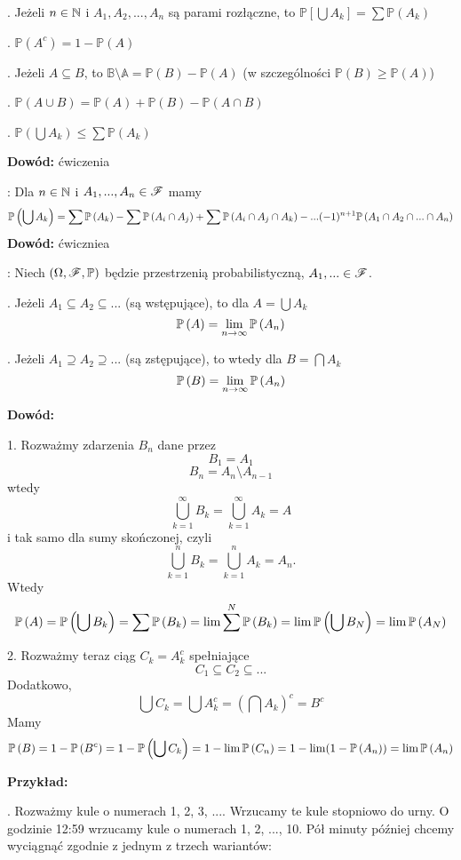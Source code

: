 \documentclass{article}
\begin{document}
. Jeżeli $n\in\mathbb{N}$ i $A_1, A_2,...,A_n$ są parami rozłączne, to $\mathbb{P}[\bigcup A_k]=\sum\mathbb{P}(A_k)$

. $\mathbb{P}(A^c)=1-\mathbb{P}(A)$

. Jeżeli $A\subseteq B$, to $\mathbb{B\setminus A}=\mathbb{P}(B)-\mathbb{P}(A)$ (w szczególności $\mathbb{P}(B)\geq\mathbb{P}(A)$)

. $\mathbb{P}(A\cup B)=\mathbb{P}(A)+\mathbb{P}(B)-\mathbb{P}(A\cap B)$

. $\mathbb{P}(\bigcup A_k)\leq\sum\mathbb{P}(A_k)$

\textbf{Dowód:} ćwiczenia \proofend
\medskip

: Dla $n\in \mathbb{N}$ i $A_1,...,A_n\in\mathcal{F}$ mamy
$$\mathbb{P}\left(\bigcup A_k\right)=\sum\mathbb{P}\left(A_k\right)-\sum\mathbb{P}\left(A_i\cap A_j\right)+\sum\mathbb{P}\left(A_i\cap A_j\cap A_k\right)-...(-1)^{n+1}\mathbb{P}\left(A_1\cap A_2\cap ...\cap A_n\right)$$
\textbf{Dowód:} ćwiczniea \proofend
\medskip

: Niech $(\Omega,\mathcal{F},\mathbb{P})$ będzie przestrzenią probabilistyczną, $A_1,...\in\mathcal{F}$. 

. Jeżeli $A_1\subseteq A_2\subseteq...$ (są wstępujące), to dla $A=\bigcup A_k$
$$\mathbb{P}\left(A\right)=\lim_{n\to\infty}\mathbb{P}\left(A_n\right)$$

. Jeżeli $A_1\supseteq A_2\supseteq...$ (są zstępujące), to wtedy dla $B=\bigcap A_k$
$$\mathbb{P}\left(B\right)=\lim_{n\to\infty}\mathbb{P}\left(A_n\right)$$

\textbf{Dowód:} 

1. Rozważmy zdarzenia $B_n$ dane przez
$$B_1=A_1$$
$$B_n=A_n\setminus A_{n-1}$$
wtedy 
$$\bigcup\limits_{k=1}^\infty B_k=\bigcup\limits_{k=1}^\infty A_k=A$$
i tak samo dla sumy skończonej, czyli
$$\bigcup\limits_{k=1}^n B_k=\bigcup\limits_{k=1}^n A_k=A_n.$$
Wtedy
$$\mathbb{P}\left(A\right)=\mathbb{P}\left(\bigcup B_k\right)=\sum\mathbb{P}\left(B_k\right)=\lim\sum^N\mathbb{P}\left(B_k\right)=\lim\mathbb{P}\left(\bigcup B_N\right)=\lim\mathbb{P}\left(A_N\right)$$

2. Rozważmy teraz ciąg $C_k=A_k^c$ spełniające
$$C_1\subseteq C_2\subseteq ...$$
Dodatkowo,
$$\bigcup C_k=\bigcup A_k^c=\left(\bigcap A_k\right)^c=B^c$$
Mamy
$$\mathbb{P}\left(B\right)=1-\mathbb{P}\left(B^c\right)=1-\mathbb{P}\left(\bigcup C_k\right)=1-\lim\mathbb{P}\left(C_n\right)=1-\lim(1-\mathbb{P}\left(A_n\right))=\lim\mathbb{P}\left(A_n\right)$$

\proofend
\medskip

\textbf{\large Przykład:}

. Rozważmy kule o numerach 1, 2, 3, .... Wrzucamy te kule stopniowo do urny. O godzinie 12:59 wrzucamy kule o numerach 1, 2, ..., 10. Pół minuty później chcemy wyciągnąć zgodnie z jednym z trzech wariantów:
\end{document}
